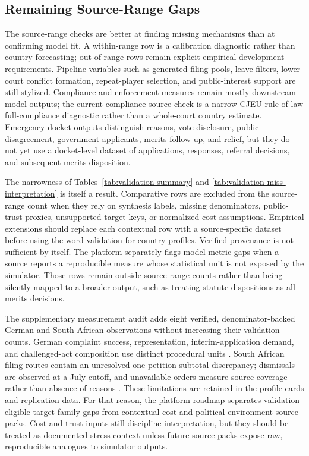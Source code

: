 \documentclass[
  journal=small,
  manuscript=research-article,
  year=2026
]{cup-journal}
\begin{document}


\subsection{Remaining Source-Range Gaps}

The source-range checks are better at finding missing mechanisms than at confirming model fit. A within-range row is a calibration diagnostic rather than country forecasting; out-of-range rows remain explicit empirical-development requirements. Pipeline variables such as generated filing pools, leave filters, lower-court conflict formation, repeat-player selection, and public-interest support are still stylized. Compliance and enforcement measures remain mostly downstream model outputs; the current compliance source check is a narrow CJEU rule-of-law full-compliance diagnostic rather than a whole-court country estimate. Emergency-docket outputs distinguish reasons, vote disclosure, public disagreement, government applicants, merits follow-up, and relief, but they do not yet use a docket-level dataset of applications, responses, referral decisions, and subsequent merits disposition.

The narrowness of Tables~\ref{tab:validation-summary} and \ref{tab:validation-miss-interpretation} is itself a result. Comparative rows are excluded from the source-range count when they rely on synthesis labels, missing denominators, public-trust proxies, unsupported target keys, or normalized-cost assumptions. Empirical extensions should replace each contextual row with a source-specific dataset before using the word validation for country profiles.
Verified provenance is not sufficient by itself. The platform separately flags model-metric gaps when a source reports a reproducible measure whose statistical unit is not exposed by the simulator. Those rows remain outside source-range counts rather than being silently mapped to a broader output, such as treating statute dispositions as all merits decisions.

The supplementary measurement audit adds eight verified, denominator-backed German and South African observations without increasing their validation counts. German complaint success, representation, interim-application demand, and challenged-act composition use distinct procedural units \citep{bverfg2024annual}. South African filing routes contain an unresolved one-petition subtotal discrepancy; dismissals are observed at a July cutoff, and unavailable orders measure source coverage rather than absence of reasons \citep{ally2024docket}. These limitations are retained in the profile cards and replication data.
For that reason, the platform roadmap separates validation-eligible target-family gaps from contextual cost and political-environment source packs. Cost and trust inputs still discipline interpretation, but they should be treated as documented stress context unless future source packs expose raw, reproducible analogues to simulator outputs.
\end{document}
